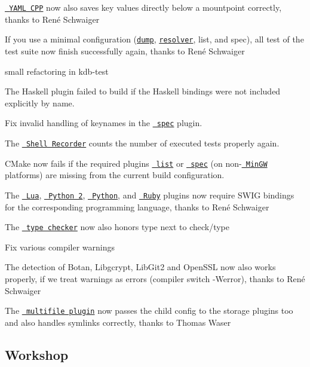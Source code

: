 \begin{DoxyItemize}
\item \href{http://libelektra.org/plugins/yamlcpp}{\texttt{ Y\+A\+ML C\+PP}} now also saves key values directly below a mountpoint correctly, thanks to René Schwaiger
\item If you use a minimal configuration (\href{http://libelektra.org/plugins/dump}{\texttt{ {\ttfamily dump}}}, \href{https://www.libelektra.org/plugins/resolver}{\texttt{ {\ttfamily resolver}}}, list, and spec), all test of the test suite now finish successfully again, thanks to René Schwaiger
\item small refactoring in {\ttfamily kdb-\/test}
\item The Haskell plugin failed to build if the Haskell bindings were not included explicitly by name.
\item Fix invalid handling of keynames in the \href{http://libelektra.org/plugins/spec}{\texttt{ spec}} plugin.
\item The \href{https://master.libelektra.org/tests/shell/shell_recorder}{\texttt{ Shell Recorder}} counts the number of executed tests properly again.
\item C\+Make now fails if the required plugins \href{http://libelektra.org/plugins/list}{\texttt{ list}} or \href{http://libelektra.org/plugins/spec}{\texttt{ spec}} (on non-\/\href{http://mingw.org}{\texttt{ Min\+GW}} platforms) are missing from the current build configuration.
\item The \href{http://libelektra.org/plugins/lua}{\texttt{ Lua}}, \href{http://libelektra.org/plugins/python2}{\texttt{ Python 2}}, \href{http://libelektra.org/plugins/python}{\texttt{ Python}}, and \href{http://libelektra.org/plugins/ruby}{\texttt{ Ruby}} plugins now require S\+W\+IG bindings for the corresponding programming language, thanks to René Schwaiger
\item The \href{https://www.libelektra.org/plugins/type}{\texttt{ type checker}} now also honors {\ttfamily type} next to {\ttfamily check/type}
\item Fix various compiler warnings
\item The detection of Botan, Libgcrypt, Lib\+Git2 and Open\+S\+SL now also works properly, if we treat warnings as errors (compiler switch {\ttfamily -\/Werror}), thanks to René Schwaiger
\item The \href{http://libelektra.org/plugins/multifile}{\texttt{ multifile plugin}} now passes the child config to the storage plugins too and also handles symlinks correctly, thanks to Thomas Waser
\end{DoxyItemize}\hypertarget{doc_news_2018-05-13_0_8_23_md_autotoc_md2209}{}\subsection{Workshop}\label{doc_news_2018-05-13_0_8_23_md_autotoc_md2209}
